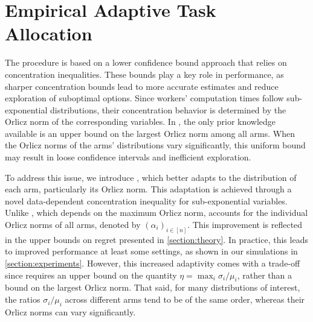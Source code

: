 \section{Empirical Adaptive Task Allocation}
\label{sec:ata-em}


The  procedure is based on a lower confidence bound approach that relies on concentration inequalities. These bounds play a key role in performance, as sharper concentration bounds lead to more accurate estimates and reduce exploration of suboptimal options. Since workers' computation times follow sub-exponential distributions, their concentration behavior is determined by the Orlicz norm of the corresponding variables.
In , the only prior knowledge available is an upper bound on the largest Orlicz norm among all arms. When the Orlicz norms of the arms' distributions vary significantly, this uniform bound may result in loose confidence intervals and inefficient exploration. 

To address this issue, we introduce , which better adapts to the distribution of each arm, particularly its Orlicz norm. This adaptation is achieved through a novel data-dependent concentration inequality for sub-exponential variables.
Unlike , which depends on the maximum Orlicz norm,  accounts for the individual Orlicz norms of all arms, denoted by $(\alpha_i)_{i\in [n]}$. This improvement is reflected in the upper bounds on regret presented in \cref{section:theory}. In practice, this leads to improved performance at least some settings, as shown in our simulations in \cref{section:experiments}. However, this increased adaptivity comes with a trade-off since  requires an upper bound on the quantity $\eta = \max_i {\sigma_i/\mu_i}$, rather than a bound on the largest Orlicz norm. That said, for many distributions of interest, the ratios $\sigma_i/\mu_i$ across different arms tend to be of the same order, whereas their Orlicz norms can vary significantly.


